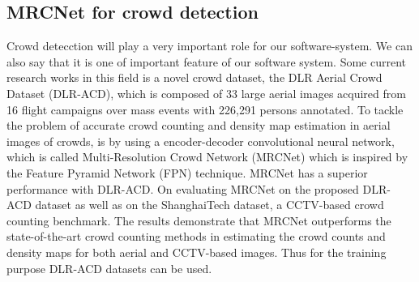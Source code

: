 \documentclass[10pt,twocolumn,letterpaper]{article}
\begin{document}
\subsection{MRCNet for crowd detection}
Crowd detecction will play a very important role for our software-system. We can also say that it is one of important feature of our software system. Some current research works in this field 
is a novel crowd dataset, the DLR Aerial Crowd Dataset (DLR-ACD), which is composed of 33 large aerial images acquired from 16 flight campaigns over mass events with 226,291 persons annotated. To
tackle the problem of accurate crowd counting and density map estimation in aerial images of crowds, is by using a encoder-decoder convolutional neural network, which is called Multi-Resolution Crowd Network (MRCNet) which is inspired by the Feature Pyramid Network (FPN) technique. MRCNet has a superior performance with DLR-ACD. On evaluating MRCNet on the proposed DLR-ACD dataset as well as on the ShanghaiTech dataset, a CCTV-based crowd counting benchmark. The results demonstrate that MRCNet outperforms the state-of-the-art crowd counting methods in estimating the crowd counts and density maps for both aerial and CCTV-based images. Thus for the training purpose DLR-ACD datasets can be used. 

\end{document}
